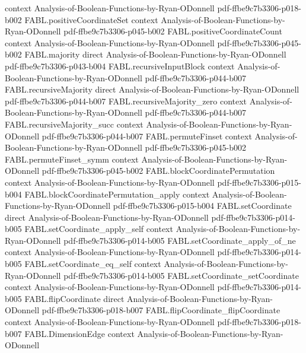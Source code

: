 \begin{theorem}
  {context}
  {Analysis-of-Boolean-Functions-by-Ryan-ODonnell}
  {pdf-ffbe9c7b3306-p018-b002}
\proofstep
  {FABL.positiveCoordinateSet}
  {context}
  {Analysis-of-Boolean-Functions-by-Ryan-ODonnell}
  {pdf-ffbe9c7b3306-p045-b002}
\proofstep
  {FABL.positiveCoordinateCount}
  {context}
  {Analysis-of-Boolean-Functions-by-Ryan-ODonnell}
  {pdf-ffbe9c7b3306-p045-b002}
\proofstep
  {FABL.majority}
  {direct}
  {Analysis-of-Boolean-Functions-by-Ryan-ODonnell}
  {pdf-ffbe9c7b3306-p043-b004}
\proofstep
  {FABL.recursiveInputBlock}
  {context}
  {Analysis-of-Boolean-Functions-by-Ryan-ODonnell}
  {pdf-ffbe9c7b3306-p044-b007}
\proofstep
  {FABL.recursiveMajority}
  {direct}
  {Analysis-of-Boolean-Functions-by-Ryan-ODonnell}
  {pdf-ffbe9c7b3306-p044-b007}
\proofstep
  {FABL.recursiveMajority_zero}
  {context}
  {Analysis-of-Boolean-Functions-by-Ryan-ODonnell}
  {pdf-ffbe9c7b3306-p044-b007}
\proofstep
  {FABL.recursiveMajority_succ}
  {context}
  {Analysis-of-Boolean-Functions-by-Ryan-ODonnell}
  {pdf-ffbe9c7b3306-p044-b007}
\proofstep
  {FABL.permuteFinset}
  {context}
  {Analysis-of-Boolean-Functions-by-Ryan-ODonnell}
  {pdf-ffbe9c7b3306-p045-b002}
\proofstep
  {FABL.permuteFinset_symm}
  {context}
  {Analysis-of-Boolean-Functions-by-Ryan-ODonnell}
  {pdf-ffbe9c7b3306-p045-b002}
\proofstep
  {FABL.blockCoordinatePermutation}
  {context}
  {Analysis-of-Boolean-Functions-by-Ryan-ODonnell}
  {pdf-ffbe9c7b3306-p015-b004}
\proofstep
  {FABL.blockCoordinatePermutation_apply}
  {context}
  {Analysis-of-Boolean-Functions-by-Ryan-ODonnell}
  {pdf-ffbe9c7b3306-p015-b004}
\proofstep
  {FABL.setCoordinate}
  {direct}
  {Analysis-of-Boolean-Functions-by-Ryan-ODonnell}
  {pdf-ffbe9c7b3306-p014-b005}
\proofstep
  {FABL.setCoordinate_apply_self}
  {context}
  {Analysis-of-Boolean-Functions-by-Ryan-ODonnell}
  {pdf-ffbe9c7b3306-p014-b005}
\proofstep
  {FABL.setCoordinate_apply_of_ne}
  {context}
  {Analysis-of-Boolean-Functions-by-Ryan-ODonnell}
  {pdf-ffbe9c7b3306-p014-b005}
\proofstep
  {FABL.setCoordinate_eq_self}
  {context}
  {Analysis-of-Boolean-Functions-by-Ryan-ODonnell}
  {pdf-ffbe9c7b3306-p014-b005}
\proofstep
  {FABL.setCoordinate_setCoordinate}
  {context}
  {Analysis-of-Boolean-Functions-by-Ryan-ODonnell}
  {pdf-ffbe9c7b3306-p014-b005}
\proofstep
  {FABL.flipCoordinate}
  {direct}
  {Analysis-of-Boolean-Functions-by-Ryan-ODonnell}
  {pdf-ffbe9c7b3306-p018-b007}
\proofstep
  {FABL.flipCoordinate_flipCoordinate}
  {context}
  {Analysis-of-Boolean-Functions-by-Ryan-ODonnell}
  {pdf-ffbe9c7b3306-p018-b007}
\proofstep
  {FABL.DimensionEdge}
  {context}
  {Analysis-of-Boolean-Functions-by-Ryan-ODonnell}

\end{theorem}
